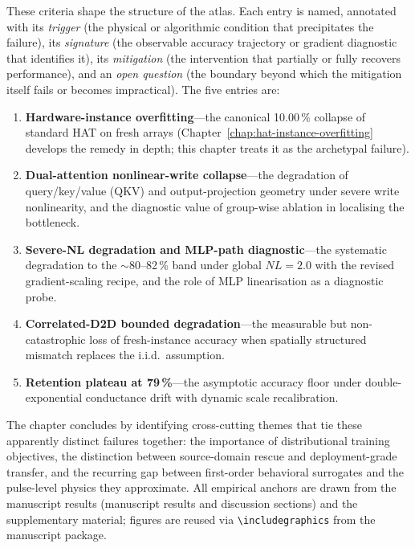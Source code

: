 These criteria shape the structure of the atlas.  Each entry is named, annotated with its \emph{trigger} (the physical or algorithmic condition that precipitates the failure), its \emph{signature} (the observable accuracy trajectory or gradient diagnostic that identifies it), its \emph{mitigation} (the intervention that partially or fully recovers performance), and an \emph{open question} (the boundary beyond which the mitigation itself fails or becomes impractical).  The five entries are:
\begin{enumerate}
    \item \textbf{Hardware-instance overfitting}---the canonical 10.00\,\% collapse of standard HAT on fresh arrays (Chapter~\ref{chap:hat-instance-overfitting} develops the remedy in depth; this chapter treats it as the archetypal failure).
    \item \textbf{Dual-attention nonlinear-write collapse}---the degradation of query/key/value (QKV) and output-projection geometry under severe write nonlinearity, and the diagnostic value of group-wise ablation in localising the bottleneck.
    \item \textbf{Severe-NL degradation and MLP-path diagnostic}---the systematic degradation to the $\sim$80--82\,\% band under global $NL=2.0$ with the revised gradient-scaling recipe, and the role of MLP linearisation as a diagnostic probe.
    \item \textbf{Correlated-D2D bounded degradation}---the measurable but non-catastrophic loss of fresh-instance accuracy when spatially structured mismatch replaces the i.i.d.~assumption.
    \item \textbf{Retention plateau at 79\,\%}---the asymptotic accuracy floor under double-exponential conductance drift with dynamic scale recalibration.
\end{enumerate}

The chapter concludes by identifying cross-cutting themes that tie these apparently distinct failures together: the importance of distributional training objectives, the distinction between source-domain rescue and deployment-grade transfer, and the recurring gap between first-order behavioral surrogates and the pulse-level physics they approximate.  All empirical anchors are drawn from the manuscript results (manuscript results and discussion sections) and the supplementary material; figures are reused via \verb|\includegraphics| from the manuscript package.


